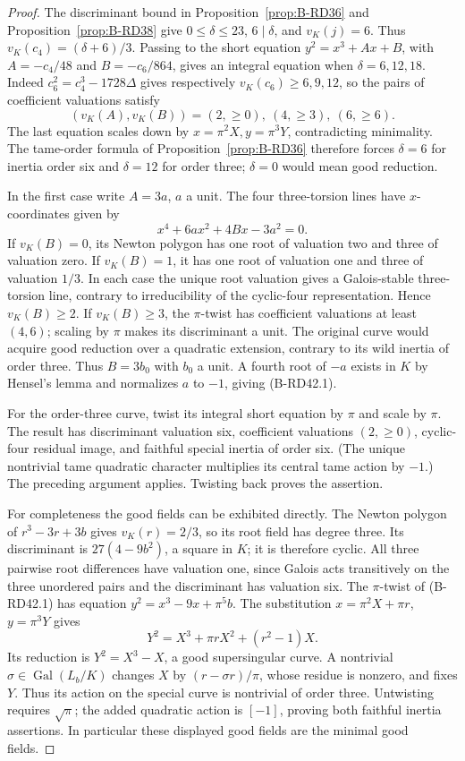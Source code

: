 \begin{proof}
The discriminant bound in Proposition~\ref{prop:B-RD36} and
Proposition~\ref{prop:B-RD38} give
$0\le\delta\le23$, $6\mid\delta$, and $v_K(j)=6$.
Thus $v_K(c_4)=(\delta+6)/3$. Passing to the short equation
$y^2=x^3+Ax+B$, with $A=-c_4/48$ and $B=-c_6/864$, gives an
integral equation when $\delta=6,12,18$. Indeed
$c_6^2=c_4^3-1728\Delta$ gives respectively
$v_K(c_6)\ge6,9,12$, so the pairs of coefficient valuations satisfy
\[
 (v_K(A),v_K(B))=(2,\ge0),\ (4,\ge3),\ (6,\ge6).
\]
The last equation scales down by $x=\pi^2X,y=\pi^3Y$, contradicting
minimality. The tame-order formula of Proposition~\ref{prop:B-RD36}
therefore forces $\delta=6$ for inertia order six and $\delta=12$
for order three; $\delta=0$ would mean good reduction.

In the first case write $A=3a$, $a$ a unit. The four three-torsion
lines have $x$-coordinates given by
\[
                     x^4+6ax^2+4Bx-3a^2=0.
                                                        \tag{B-RD42.3}
\]
If $v_K(B)=0$, its Newton polygon has one root of valuation two
and three of valuation zero. If $v_K(B)=1$, it has one root of
valuation one and three of valuation $1/3$. In each case the unique
root valuation gives a Galois-stable three-torsion line, contrary
to irreducibility of the cyclic-four representation. Hence
$v_K(B)\ge2$. If $v_K(B)\ge3$, the $\pi$-twist has coefficient
valuations at least $(4,6)$; scaling by $\pi$ makes its discriminant
a unit. The original curve would acquire good reduction over a
quadratic extension, contrary to its wild inertia of order three.
Thus $B=3b_0$ with $b_0$ a unit. A fourth root of $-a$ exists in $K$
by Hensel's lemma and normalizes $a$ to $-1$, giving (B-RD42.1).

For the order-three curve, twist its integral short equation by
$\pi$ and scale by $\pi$. The result has discriminant valuation six,
coefficient valuations $(2,\ge0)$, cyclic-four residual image, and
faithful special inertia of order six. (The unique nontrivial tame
quadratic character multiplies its central tame action by $-1$.)
The preceding argument applies. Twisting back proves the assertion.

For completeness the good fields can be exhibited directly.
The Newton polygon of $r^3-3r+3b$ gives $v_K(r)=2/3$, so its
root field has degree three. Its discriminant is
$27(4-9b^2)$, a square in $K$; it is therefore cyclic. All three
pairwise root differences have valuation one, since Galois acts
transitively on the three unordered pairs and the discriminant has
valuation six. The $\pi$-twist of (B-RD42.1) has equation
$y^2=x^3-9x+\pi^5b$. The substitution
$x=\pi^2X+\pi r$, $y=\pi^3Y$ gives
\[
              Y^2=X^3+\pi rX^2+(r^2-1)X.
                                                        \tag{B-RD42.4}
\]
Its reduction is $Y^2=X^3-X$, a good supersingular curve.
A nontrivial $\sigma\in\operatorname{Gal}(L_b/K)$ changes $X$ by
$(r-\sigma r)/\pi$, whose residue is nonzero, and fixes $Y$.
Thus its action on the special curve is nontrivial of order three.
Untwisting requires $\sqrt\pi$; the added quadratic action is
$[-1]$, proving both faithful inertia assertions. In particular
these displayed good fields are the minimal good fields.


\end{proof}
